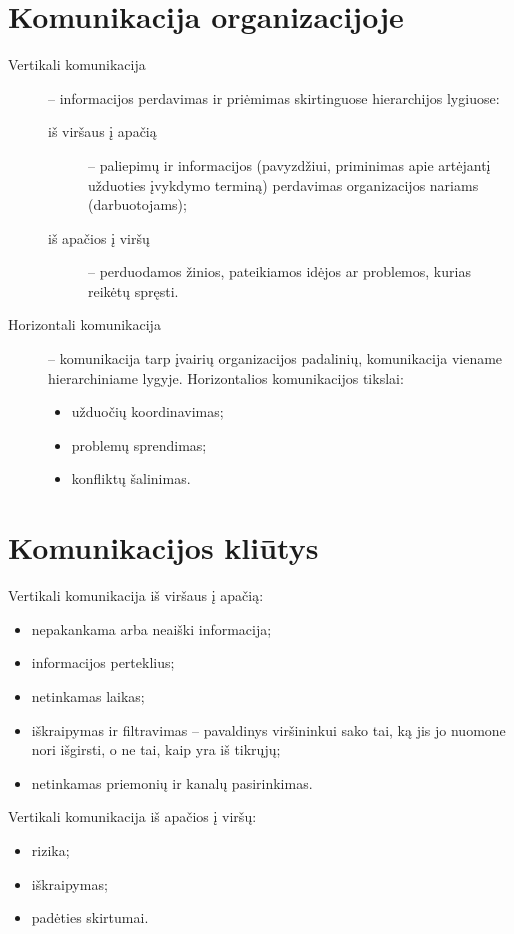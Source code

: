 \section{Komunikacija organizacijoje}

\begin{description}
  \item[Vertikali komunikacija] – informacijos perdavimas ir priėmimas
    skirtinguose hierarchijos lygiuose:
    \begin{description}
      \item[iš viršaus į apačią] – paliepimų ir informacijos
        (pavyzdžiui, priminimas apie artėjantį užduoties įvykdymo
        terminą) perdavimas organizacijos nariams (darbuotojams);
      \item[iš apačios į viršų] – perduodamos žinios, pateikiamos idėjos
        ar problemos, kurias reikėtų spręsti.
    \end{description}
  \item[Horizontali komunikacija] – komunikacija tarp įvairių organizacijos
    padalinių, komunikacija viename hierarchiniame lygyje. Horizontalios
    komunikacijos tikslai:
    \begin{itemize}
      \item užduočių koordinavimas;
      \item problemų sprendimas;
      \item konfliktų šalinimas.
    \end{itemize}
\end{description}

\section{Komunikacijos kliūtys}

Vertikali komunikacija iš viršaus į apačią:
\begin{itemize}
  \item nepakankama arba neaiški informacija;
  \item informacijos perteklius;
  \item netinkamas laikas;
  \item iškraipymas ir filtravimas – pavaldinys viršininkui sako tai,
    ką jis jo nuomone nori išgirsti, o ne tai, kaip yra iš tikrųjų;
  \item netinkamas priemonių ir kanalų pasirinkimas.
\end{itemize}

Vertikali komunikacija iš apačios į viršų:
\begin{itemize}
  \item rizika;
  \item iškraipymas;
  \item padėties skirtumai.
\end{itemize}

